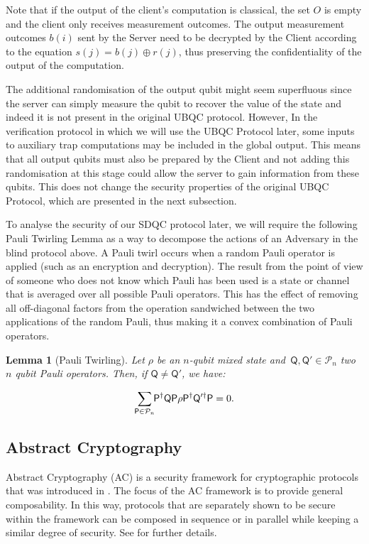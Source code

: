 \documentclass[12pt]{iopart}
\newcommand{\cptp}[1]{\mathsf{#1}} \newcommand{\pd}[1]{\mathcal{#1}}  \newcommand{\sch}[1]{\bm{#1}}
\renewcommand{\1}{\mathds{1}}
\newtheorem{lemma}{Lemma}
\begin{document}
Note that if the output of the client's computation is classical, the set $O$ is empty and the client only receives measurement outcomes. The output measurement outcomes $b(i)$ sent by the Server need to be decrypted by the Client according to the equation $s(j) = b(j) \oplus r(j)$, thus preserving the confidentiality of the output of the computation.

The additional randomisation of the output qubit might seem superfluous since the server can simply measure the qubit to recover the value of the state and indeed it is not present in the original UBQC protocol. However, In the verification protocol in which we will use the UBQC Protocol later, some inputs to auxiliary trap computations may be included in the global output. This means that all output qubits must also be prepared by the Client and not adding this randomisation at this stage could allow the server to gain information from these qubits. This does not change the security properties of the original UBQC Protocol, which are presented in the next subsection.

To analyse the security of our SDQC protocol later, we will require the following Pauli Twirling Lemma as a way to decompose the actions of an Adversary in the blind protocol above. A Pauli twirl occurs when a random Pauli operator is applied (such as an encryption and decryption). The result from the point of view of someone who does not know which Pauli has been used is a state or channel that is averaged over all possible Pauli operators. This has the effect of removing all off-diagonal factors from the operation sandwiched between the two applications of the random Pauli, thus making it a convex combination of Pauli operators.

\begin{lemma}[Pauli Twirling]
\label{lem:twirl}
Let $\rho$ be an $n$-qubit mixed state and~$\cptp Q, \cptp Q' \in \mathcal{P}_n$ two $n$ qubit Pauli operators. Then, if $\cptp Q \neq \cptp Q'$, we have:

\begin{align}
\smashoperator[r]{\sum_{\cptp P \in \mathcal{P}_n}} \cptp P^{\dagger} \cptp Q \cptp P \rho \cptp P^{\dagger} \cptp Q'^{\dagger} \cptp P = 0.
\end{align}
\end{lemma}

\subsection{Abstract Cryptography}
\label{sec:ac}
Abstract Cryptography (AC) is a security framework for cryptographic protocols that was introduced in \cite{MR11:abstract-cryptography,M12:constructive-cryptography}.
The focus of the AC framework is to provide general composability. In this way, protocols that are separately shown to be secure within the framework can be composed in sequence or in parallel while keeping a similar degree of security. See \cite{DFPR14:composable} for further details.
\end{document}
